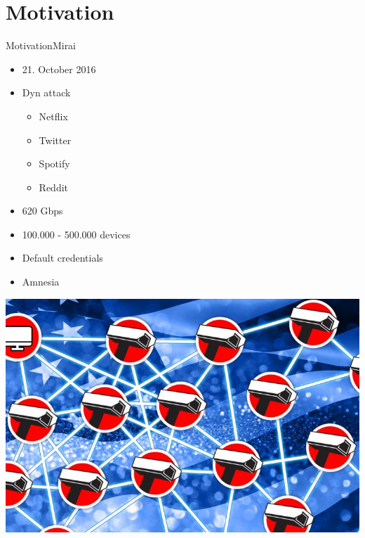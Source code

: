 \section{Motivation}
\begin{frame}{Motivation}{Mirai}


\begin{minipage}{0.48\textwidth}
\begin{itemize}
	\item 21. October 2016
	\item Dyn attack 
	\begin{itemize}
		\item Netflix
		\item Twitter
		\item Spotify
		\item Reddit
	\end{itemize}
	\item 620 Gbps
	\item 100.000 - 500.000 devices
	\item Default credentials
	\item Amnesia
	
\end{itemize}
\end{minipage}
\hfill
\begin{minipage}{0.48\textwidth}
\vspace{0.4\textheight}
	\includegraphics[width=\textwidth]{figs/botnet}
\end{minipage}
\end{frame}
